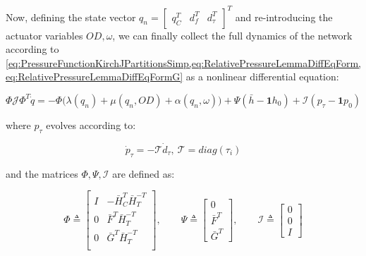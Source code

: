 Now, defining the state vector $q_n = \begin{bmatrix}q_C^T & d_f^T & d_{\tau}^T \end{bmatrix}^T$ and re-introducing the actuator variables $OD, \omega$, we can finally collect the full dynamics of the network according to \cref{eq:PressureFunctionKirchJPartitionsSimp,eq:RelativePressureLemmaDiffEqForm,eq:RelativePressureLemmaDiffEqFormG} as a nonlinear differential equation:

\begin{equation}\label{eq:NonLinearModelWithTank}
	\Phi\mathcal{J}\Phi^T \dot{q} = -\Phi\Big(\lambda(q_n)+\mu(q_n,OD)+\alpha(q_n,\omega)\Big) + \Psi(\bar{h}-\mathbf{1}h_0) + \mathcal{I}(p_{\tau}-\mathbf{1}p_0)
\end{equation}

where $p_{\tau}$ evolves according to:

\begin{equation}\label{eq:TankDynamics}
	\dot{p}_{\tau} = - \mathcal{T} \dot{d}_{\tau}, \ \mathcal{T} = diag(\tau_i)
\end{equation}

and the matrices $\Phi, \Psi, \mathcal{I}$ are defined as:

\begin{equation}\label{eq:NonLinearModelMatrices}
	\Phi \triangleq 
	\begin{bmatrix} 
		I & -\bar{H}_C^T\bar{H}_T^{-T} \\ 0 & \bar{F}^T\bar{H}_T^{-T} \\ 0  & \bar{G}^T\bar{H}_T^{-T} \\ 
	\end{bmatrix}
	, \qquad
	\Psi \triangleq
	\begin{bmatrix}
		0 \\ \bar{F}^T \\ \bar{G}^T
	\end{bmatrix}
	, \qquad
	\mathcal{I} \triangleq
	\begin{bmatrix}
		0 \\ 0 \\ I
	\end{bmatrix}
\end{equation}
